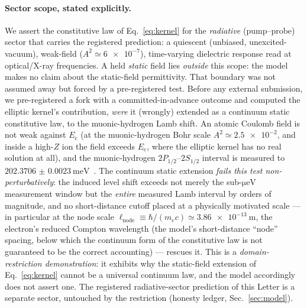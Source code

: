 \documentclass[aps,prd,twocolumn,superscriptaddress,nofootinbib,longbibliography]{revtex4-2}
\newcommand{\Ec}{E_{\mathrm{c}}}
\begin{document}
\paragraph*{Sector scope, stated explicitly.} We assert the constitutive law of
Eq.~\eqref{eq:kernel} for the \emph{radiative} (pump--probe) sector that carries
the registered prediction: a quiescent (unbiased, unexcited-vacuum), weak-field
($A^2\simeq\num{6e-7}$), time-varying dielectric response read at optical/X-ray
frequencies. A held \emph{static} field lies \emph{outside} this scope: the model
makes no claim about the static-field permittivity. That boundary was not assumed
away but forced by a pre-registered test. Before any external submission, we
pre-registered a fork with a committed-in-advance outcome and computed the
elliptic kernel's contribution, \emph{were} it (wrongly) extended as a continuum
static constitutive law, to the muonic-hydrogen Lamb shift. An atomic Coulomb
field is not weak against $\Ec$ (at the muonic-hydrogen Bohr scale
$A^2\simeq\num{2.5e-2}$, and inside a high-$Z$ ion the field exceeds $\Ec$, where
the elliptic kernel has no real solution at all), and the muonic-hydrogen
$2P_{1/2}$--$2S_{1/2}$ interval is measured to
$\SI{202.3706(23)}{\milli\electronvolt}$~\cite{Antognini2013}. The continuum
static extension \emph{fails this test non-perturbatively}: the induced level
shift exceeds not merely the sub-$\si{\micro\electronvolt}$ measurement window but
the \emph{entire} measured Lamb interval by orders of magnitude, and no
short-distance cutoff placed at a physically motivated scale --- in particular at
the node scale $\ell_{\mathrm{node}}\equiv\hbar/(m_ec)\simeq\SI{3.86e-13}{\meter}$,
the electron's reduced Compton wavelength (the model's short-distance
``node'' spacing, below which the continuum form of the constitutive law is not
guaranteed to be the correct accounting) --- rescues it. This is a
\emph{domain-restriction demonstration}: it exhibits why the static-field
extension of Eq.~\eqref{eq:kernel} cannot be a universal continuum law, and the
model accordingly does not assert one. The registered radiative-sector prediction
of this Letter is a separate sector, untouched by the restriction (honesty
ledger, Sec.~\ref{sec:model}).
\end{document}
